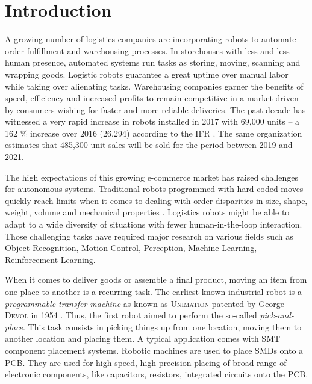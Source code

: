 \documentclass[/home/francois/latex/report/main.tex]{subfiles}
\begin{document}
\chapter{Introduction}

A growing number of logistics companies are incorporating robots to automate order fulfillment and warehousing processes. In storehouses with less and less human presence, automated systems run tasks as storing, moving, scanning and wrapping goods. Logistic robots guarantee a great uptime over manual labor while taking over alienating tasks. Warehousing companies garner the benefits of speed, efficiency and increased profits to remain competitive in a market driven by consumers wishing for faster and more reliable deliveries. The past decade has witnessed a very rapid increase in robots installed in 2017 with 69,000 units – a 162 \% increase over 2016 (26,294) according to the \ac{IFR} \cite{industrialRobot2018}. The same organization estimates that 485,300 unit sales will be sold for the period between 2019 and 2021.

The high expectations of this growing e-commerce market has raised challenges for autonomous systems. Traditional robots programmed with hard-coded moves quickly reach limits when it comes to dealing with order disparities in size, shape, weight, volume and mechanical properties \cite{GQHuang2015}. Logistics robots might be able to adapt to a wide diversity of situations with fewer human-in-the-loop interaction. Those challenging tasks have required major research on various fields such as Object Recognition, Motion Control, Perception, Machine Learning, Reinforcement Learning.

When it comes to deliver goods or assemble a final product, moving an item from one place to another is a recurring task. The earliest known industrial robot is a \textit{programmable transfer machine} as known as \textsc{Unimation} patented by George \textsc{Devol} in 1954 \cite{Wallen2008}. Thus, the first robot aimed to perform the so-called \textit{pick-and-place}. This task consists in picking things up from one location, moving them to another location and placing them. A typical application comes with \ac{SMT} component placement systems. Robotic machines are used to place \ac{SMDs} onto a \ac{PCB}. They are used for high speed, high precision placing of broad range of electronic components, like capacitors, resistors, integrated circuits onto the \ac{PCB}.
\end{document}
